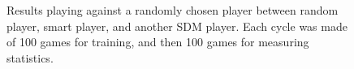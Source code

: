 \begin{figure}[!htb]
\centering
{}


\caption{Results playing against a randomly chosen player between random player, smart player, and another SDM player. Each cycle was made of 100 games for training, and then 100 games for measuring statistics.
\label{fig:ttt-results-mixed}
}
\end{figure}
